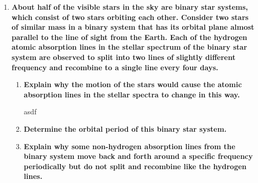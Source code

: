 \documentclass{report}
\begin{document}
\begin{enumerate}
				\item \textbf{About half of the visible stars in the sky are binary star systems, which consist of two stars orbiting each other. Consider two stars of similar mass in a binary system that has its orbital plane almost parallel to the line of sight from the Earth. Each of the hydrogen atomic absorption lines in the stellar spectrum of the binary star system are observed to split into two lines of slightly different frequency and recombine to a single line every four days.}
					\begin{enumerate}
						\item \textbf{Explain why the motion of the stars would cause the atomic absorption lines in the stellar spectra to change in this way.}

							asdf

						\item \textbf{Determine the orbital period of this binary star system.}

						\item \textbf{Explain why some non-hydrogen absorption lines from the binary system move back and forth around a specific frequency periodically but do not split and recombine like the hydrogen lines.}
					\end{enumerate}
		\end{enumerate}
\end{document}
